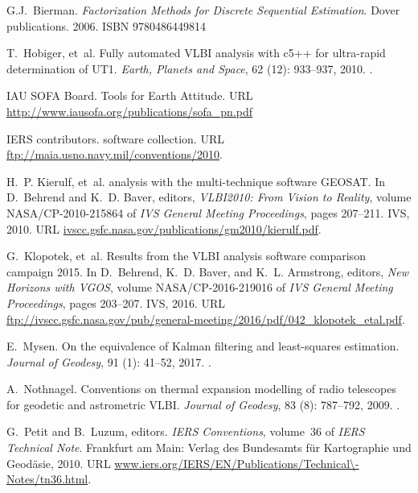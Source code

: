 \documentclass[natbib,twocolumn,twoside]{svmultiag}
\begin{document}
\begin{thebibliography}{10}
G.J.~Bierman.
\newblock \emph{Factorization Methods for Discrete Sequential Estimation}.
\newblock Dover publications. 2006.
\newblock ISBN 9780486449814

T.~Hobiger, et~al.
\newblock Fully automated {VLBI} analysis with c5++ for ultra-rapid
  determination of {UT1}.
\newblock \emph{Earth, Planets and Space}, 62 (12): 933--937, 2010.
\newblock {}.

{IAU SOFA Board}.
 Tools for Earth Attitude.
\newblock URL \url{http://www.iausofa.org/publications/sofa\_pn.pdf}

{IERS contributors}.
 software collection.
\newblock URL \url{ftp://maia.usno.navy.mil/conventions/2010}.

H.~P. Kierulf, et~al.
 analysis with the multi-technique software {GEOSAT}.
\newblock In D.~Behrend and K.~D. Baver, editors, \emph{VLBI2010: From Vision
  to Reality}, volume NASA/CP-2010-215864 of \emph{IVS General Meeting
  Proceedings}, pages 207--211. IVS, 2010.
\newblock URL \url{ivscc.gsfc.nasa.gov/publications/gm2010/kierulf.pdf}.

G.~Klopotek, et~al.
\newblock Results from the {VLBI} analysis software comparison campaign 2015.
\newblock In D.~Behrend, K.~D. Baver, and K.~L. Armstrong, editors, \emph{New
  Horizons with VGOS}, volume NASA/CP-2016-219016 of \emph{IVS General Meeting
  Proceedings}, pages 203--207. IVS, 2016.
\newblock URL \url{ftp://ivscc.gsfc.nasa.gov/pub/general-meeting/2016/pdf/042\_klopotek\_etal.pdf}.

E.~Mysen.
\newblock On the equivalence of {K}alman filtering and least-squares  estimation.
\newblock \emph{Journal of Geodesy}, 91 (1): 41--52, 2017.
\newblock {}.

A.~Nothnagel.
\newblock Conventions on thermal expansion modelling of radio telescopes for
  geodetic and astrometric {VLBI}.
\newblock \emph{Journal of Geodesy}, 83 (8): 787--792, 2009.
\newblock {}.

G.~Petit and B.~Luzum, editors.
\newblock \emph{{IERS} Conventions}, volume~36 of \emph{IERS Technical Note}.
\newblock Frankfurt am Main: Verlag des Bundesamts f\"ur Kartographie und
  Geod\"asie, 2010.
\newblock URL \url{www.iers.org/IERS/EN/Publications/Technical\-Notes/tn36.html}.

\end{thebibliography}
\end{document}
